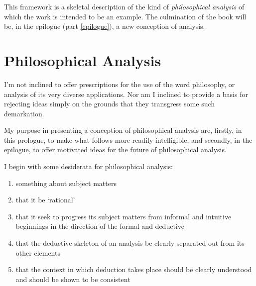 This framework is a skeletal description of the kind of \emph{philosophical analysis} of which the work is intended to be an example.
The culmination of the book will be, in the epilogue (part \ref{epilogue}), a new conception of analysis.

\chapter{Philosophical Analysis}

I'm not inclined to offer prescriptions for the use of the word philosophy, or analysis of its very diverse applications.
Nor am I inclined to provide a basis for rejecting ideas simply on the grounds that they transgress some such demarkation.

My purpose in presenting a conception of philosophical analysis are, firstly, in this prologue, to make what follows more readily intelligible, and secondly, in the epilogue, to offer motivated ideas for the future of philosophical analysis.

I begin with some desiderata for philosophical analysis:

\begin{enumerate}
\item something about subject matters
\item that it be `rational'
\item that it seek to progress its subject matters from informal and intuitive beginnings in the direction of the formal and deductive
\item that the deductive skeleton of an analysis be clearly separated out from its other elements
\item that the context in which deduction takes place should be clearly understood and should be shown to be consistent
\end{enumerate}


